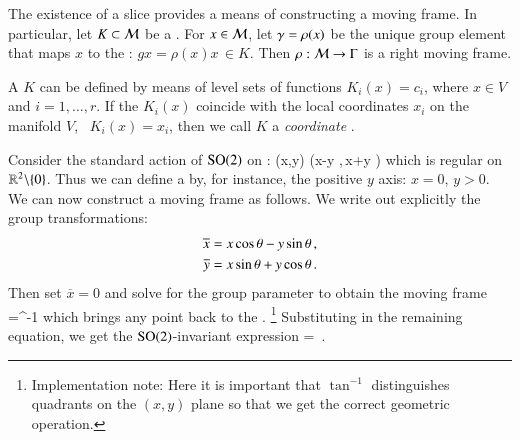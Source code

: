 The existence of a slice provides a means of constructing a moving frame.
In particular, let $K\subset\mathcal{M}$ be a {\csection}. For $x\in \mathcal{M}$, let
$\gamma=\rho(x)$ be the unique group element that maps $x$
to the {\csection}: $g x = \rho(x) x\, \in K$. Then
$\rho:\mathcal{M}\rightarrow \Gamma$ is a right moving frame.

A {\csection} $K$ can be defined by means of level sets of
functions $K_i(x)=c_i$, where $x\in V$ and $i=1,\ldots,r$. If
the $K_i(x)$ coincide with the local coordinates $x_i$ on the
manifold $V$, \ie~$K_i(x)=x_i$, then we call $K$ a
\emph{coordinate \csection}.

\begin{example}
Consider the standard action of $\textrm{SO}(2)$ on :
\beq
	(x,y) \mapsto (x\cos\theta -y \sin\theta,\,x\sin\theta +y \cos\theta )
\eeq
which is regular on $\mathbb{R}^{2}\backslash\{0\}$. Thus we can define
a {\csection} by, for instance, the
positive $y$ axis: $x=0,\,y>0$.
We can now construct a moving frame as follows. We write out
explicitly the group transformations:
\begin{subequations}
\begin{align}
 	\overline{x} &= x \cos\theta - y \sin\theta\label{eq:explSO2stnd1}\,, \\ 
	\overline{y} &= x \sin\theta + y \cos\theta\label{eq:explSO2stnd2}\,.
\end{align}
\end{subequations}
Then set $\overline{x}=0$ and solve  for the group
parameter to obtain the moving frame
\beq
	\theta=\tan^{-1}
	\label{eq:SO2stndMF}
\eeq
which brings any point  back to the {\csection}.
\footnote{Implementation note: Here it is important that
$\tan^{-1}$ distinguishes quadrants on the $(x,y)$ plane so
that we get the correct geometric operation.}
Substituting  in the remaining equation,
we get the $\textrm{SO}(2)$-invariant expression
\beq
	 = \,.
\eeq
\end{example}

